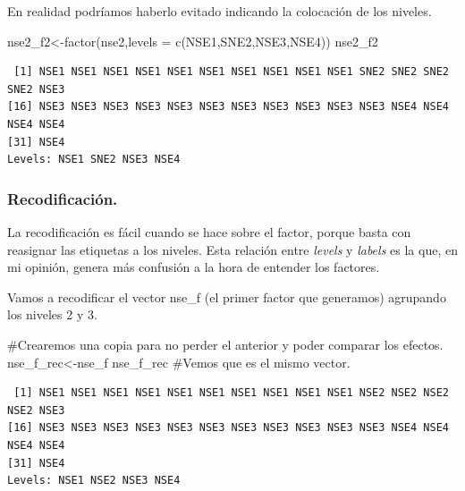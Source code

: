 \documentclass[
  letterpaper,
  DIV=11,
  numbers=noendperiod]{scrreprt}
\newenvironment{Shaded}{\begin{snugshade}}{\end{snugshade}}
\newcommand{\AttributeTok}[1]{\textcolor[rgb]{0.40,0.45,0.13}{#1}}
\newcommand{\CommentTok}[1]{\textcolor[rgb]{0.37,0.37,0.37}{#1}}
\newcommand{\FunctionTok}[1]{\textcolor[rgb]{0.28,0.35,0.67}{#1}}
\newcommand{\NormalTok}[1]{\textcolor[rgb]{0.00,0.23,0.31}{#1}}
\newcommand{\OtherTok}[1]{\textcolor[rgb]{0.00,0.23,0.31}{#1}}
\newcommand{\StringTok}[1]{\textcolor[rgb]{0.13,0.47,0.30}{#1}}
\begin{document}
En realidad podríamos haberlo evitado indicando la colocación de los
niveles.

\begin{Shaded}
\begin{Highlighting}[]
\NormalTok{nse2\_f2}\OtherTok{\textless{}{-}}\FunctionTok{factor}\NormalTok{(nse2,}\AttributeTok{levels =} \FunctionTok{c}\NormalTok{(}\StringTok{\textquotesingle{}NSE1\textquotesingle{}}\NormalTok{,}\StringTok{\textquotesingle{}SNE2\textquotesingle{}}\NormalTok{,}\StringTok{\textquotesingle{}NSE3\textquotesingle{}}\NormalTok{,}\StringTok{\textquotesingle{}NSE4\textquotesingle{}}\NormalTok{))}
\NormalTok{nse2\_f2}
\end{Highlighting}
\end{Shaded}

\begin{verbatim}
 [1] NSE1 NSE1 NSE1 NSE1 NSE1 NSE1 NSE1 NSE1 NSE1 NSE1 SNE2 SNE2 SNE2 SNE2 NSE3
[16] NSE3 NSE3 NSE3 NSE3 NSE3 NSE3 NSE3 NSE3 NSE3 NSE3 NSE3 NSE4 NSE4 NSE4 NSE4
[31] NSE4
Levels: NSE1 SNE2 NSE3 NSE4
\end{verbatim}

\hypertarget{recodificaciuxf3n.-1}{%
\subsubsection{Recodificación.}\label{recodificaciuxf3n.-1}}

La recodificación es fácil cuando se hace sobre el factor, porque basta
con reasignar las etiquetas a los niveles. Esta relación entre
\emph{levels} y \emph{labels} es la que, en mi opinión, genera más
confusión a la hora de entender los factores.

Vamos a recodificar el vector nse\_f (el primer factor que generamos)
agrupando los niveles 2 y 3.

\begin{Shaded}
\begin{Highlighting}[]
\CommentTok{\#Crearemos una copia para no perder el anterior y poder comparar los efectos.}
\NormalTok{nse\_f\_rec}\OtherTok{\textless{}{-}}\NormalTok{nse\_f }
\NormalTok{nse\_f\_rec }\CommentTok{\#Vemos que es el mismo vector.}
\end{Highlighting}
\end{Shaded}

\begin{verbatim}
 [1] NSE1 NSE1 NSE1 NSE1 NSE1 NSE1 NSE1 NSE1 NSE1 NSE1 NSE2 NSE2 NSE2 NSE2 NSE3
[16] NSE3 NSE3 NSE3 NSE3 NSE3 NSE3 NSE3 NSE3 NSE3 NSE3 NSE3 NSE4 NSE4 NSE4 NSE4
[31] NSE4
Levels: NSE1 NSE2 NSE3 NSE4
\end{verbatim}
\end{document}
